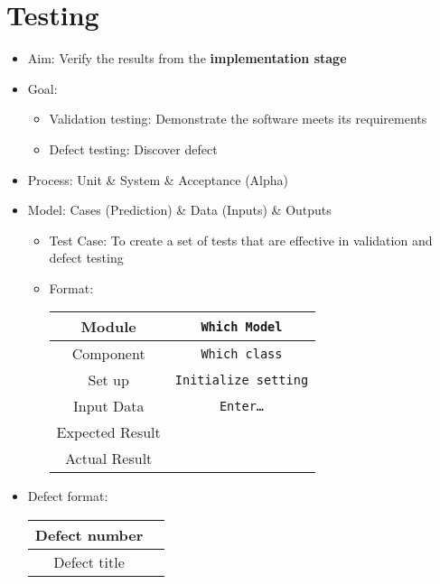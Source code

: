 \documentclass[12pt,openany]{book}
\begin{document}
\section{Testing}
\begin{itemize}
    \item Aim: Verify the results from the \textbf{implementation stage}
    \item Goal:
    \begin{itemize}
        \item Validation testing: Demonstrate the software meets its requirements
        \item Defect testing: Discover defect
    \end{itemize}
    \item Process: Unit \& System \& Acceptance (Alpha)
    \item Model: Cases (Prediction) \& Data (Inputs) \& Outputs
    \begin{itemize}
        \item Test Case: To create a set of tests that are effective in validation and defect testing
        \item Format:
        \begin{table}[H]
            \centering
            \begin{tabular}{|c|c|}
                \hline
                Module& \texttt{Which Model}\\
                \hline
                Component& \texttt{Which class}\\
                \hline
                Set up& \texttt{Initialize setting}\\
                \hline
                Input Data& \texttt{Enter\dots}\\
                \hline
                Expected Result&\\
                \hline
                Actual Result&\\
                \hline
            \end{tabular}
        \end{table}
    \end{itemize}
    \item Defect format:
    \begin{table}[H]
        \centering
        \begin{tabular}{|c|c|}
            \hline
            Defect number&\\
            \hline
            Defect title&\\

\end{tabular}
\end{table}
\end{itemize}
\end{document}
